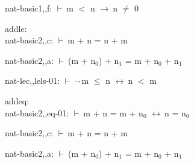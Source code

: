 \documentclass[a4paper]{article}
\newcommand{\Fol}{\mbox{$\vdash\ $}}
\newcommand{\Not}{\mbox{$\neg\ $}}
\newcommand{\Imp}{\mbox{$\rightarrow\ $}}
\newcommand{\Equiv}{\mbox{$\leftrightarrow\ $}}
\begin{document}
nat-basic1,,f: 
 \Fol m $<$ n \Imp n $\neq$ 0



\bigskip

addle:\\ nat-basic2,,c: 
 \Fol m + n = n + m



nat-basic2,,a: 
 \Fol (m + $\mbox{n}_{0}$) + $\mbox{n}_{1}$ = m + $\mbox{n}_{0}$ + $\mbox{n}_{1}$



nat-lec,,lels-01: 
 \Fol \Not m $\le$ n \Equiv n $<$ m



\bigskip

addeq:\\ nat-basic2,,eq-01: 
 \Fol m + n = m + $\mbox{n}_{0}$ \Equiv n = $\mbox{n}_{0}$



nat-basic2,,c: 
 \Fol m + n = n + m



nat-basic2,,a: 
 \Fol (m + $\mbox{n}_{0}$) + $\mbox{n}_{1}$ = m + $\mbox{n}_{0}$ + $\mbox{n}_{1}$



\bigskip
\end{document}
